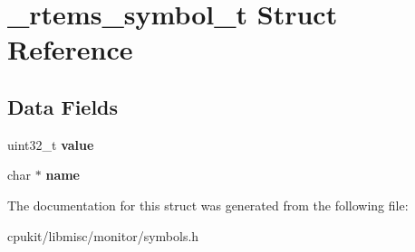\hypertarget{struct__rtems__symbol__t}{}\section{\+\_\+rtems\+\_\+symbol\+\_\+t Struct Reference}
\label{struct__rtems__symbol__t}
\subsection*{Data Fields}
\begin{DoxyCompactItemize}
\item 
\mbox{\label{struct__rtems__symbol__t_a8a49511ccd637393cdd130804cc508f4}} 
uint32\+\_\+t {\bfseries value}
\item 
\mbox{\label{struct__rtems__symbol__t_a7317d09120bdfaef67360d56f4fb7211}} 
char $\ast$ {\bfseries name}
\end{DoxyCompactItemize}


The documentation for this struct was generated from the following file\+:\begin{DoxyCompactItemize}
\item 
cpukit/libmisc/monitor/symbols.\+h\end{DoxyCompactItemize}
